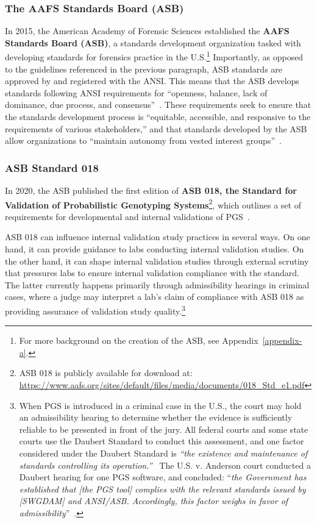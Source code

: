 \subsubsection{The AAFS Standards Board (ASB)} 
\label{sec:background-asb}
In 2015, the American Academy of Forensic Sciences established the \textbf{AAFS Standards Board (ASB)}, a standards development organization tasked with developing standards for forensics practice in the U.S.\footnote{For more background on the creation of the ASB, see Appendix~\ref{appendix-a}.} Importantly, as opposed to the guidelines referenced in the previous paragraph, ASB standards are approved by and registered with the ANSI. This means that the ASB develops standards following ANSI requirements for ``openness, balance, lack of dominance, due process, and consensus''~\cite{ansi}. These requirements seek to ensure that the standards development process is ``equitable, accessible, and responsive to the requirements of various stakeholders,'' and that standards developed by the ASB allow organizations to ``maintain autonomy from vested interest groups''~\cite{asb2025about}.


\subsubsection{ASB Standard 018} 
\label{sec:background-asb018}
In 2020, the ASB published the first edition of \textbf{ASB 018, the Standard for Validation of Probabilistic Genotyping Systems}\footnote{ASB 018 is publicly available for download at: \url{https://www.aafs.org/sites/default/files/media/documents/018_Std_e1.pdf}}, which outlines a set of requirements for developmental and internal validations of PGS~\cite{asb018}. 

ASB 018 can influence internal validation study practices in several ways. On one hand, it can provide guidance to labs conducting internal validation studies. On the other hand, it can shape internal validation studies through external scrutiny that pressures labs to ensure internal validation compliance with the standard. The latter currently happens primarily through admissibility hearings in criminal cases, where a judge may interpret a lab's claim of compliance with ASB 018 as providing assurance of validation study quality.\footnote{When PGS is introduced in a criminal case in the U.S., the court may hold an admissibility hearing to determine whether the evidence is sufficiently reliable to be presented in front of the jury. All federal courts and some state courts use the Daubert Standard to conduct this assessment, and one factor considered under the Daubert Standard is \textit{``the existence and maintenance of standards controlling its operation.''}~\cite{wexlaw_daubert} The U.S. v. Anderson court conducted a Daubert hearing for one PGS software, and concluded: ``\textit{the Government has established that [the PGS tool] complies with the relevant standards issued by [SWGDAM] and ANSI/ASB. Accordingly, this factor weighs in favor of admissibility}''~\cite{2023anderson}.} 

